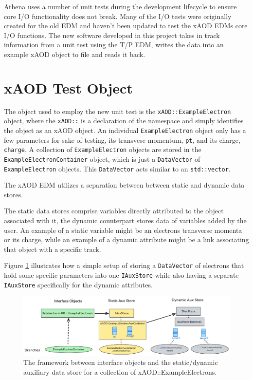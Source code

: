 Athena uses a number of unit tests during the development lifecycle to ensure core I/O functionality does not break.
Many of the I/O tests were originally created for the old EDM and haven't been updated to test the xAOD EDMs core I/O functions.
The new software developed in this project takes in track information from a unit test using the T/P EDM, writes the data into an example xAOD object to file and reads it back.


\section{xAOD Test Object}
\label{sec:Mod_utests_xAOD_object}

The object used to employ the new unit test is the \verb|xAOD::ExampleElectron| object, where the \verb|xAOD::| is a declaration of the namespace and simply identifies the object as an xAOD object.
An individual \verb|ExampleElectron| object only has a few parameters for sake of testing, its transvese momentum, \verb|pt|, and its charge, \verb|charge|.
A collection of \verb|ExampleElectron| objects are stored in the \verb|ExampleElectronContainer| object, which is just a \verb|DataVector| of \verb|ExampleElectron| objects.\cite{Buckley_2015}
This \verb|DataVector| acts similar to an \verb|std::vector|. 
 
The xAOD EDM utilizes a separation between between static and dynamic data stores.

The static data stores comprise variables directly attributed to the object associated with it, the dynamic counterpart stores data of variables added by the user.
An example of a static variable might be an electrons transverse momenta or its charge, while an example of a dynamic attribute might be a link associating that object with a specific track.  


Figure \ref{fig:Mod_utests_aux_store} illustrates how a simple setup of storing a \verb|DataVector| of electrons that hold some specific parameters into one \verb|IAuxStore| while also having a separate \verb|IAuxStore| specifically for the dynamic attributes. 

\begin{figure}[h]
    \centering
    \includegraphics[width=\textwidth]{content/img/aux_store_better.png}
    \caption{The framework between interface objects and the static/dynamic auxiliary data store for a collection of xAOD::ExampleElectrons.}
    \label{fig:Mod_utests_aux_store}
\end{figure}





